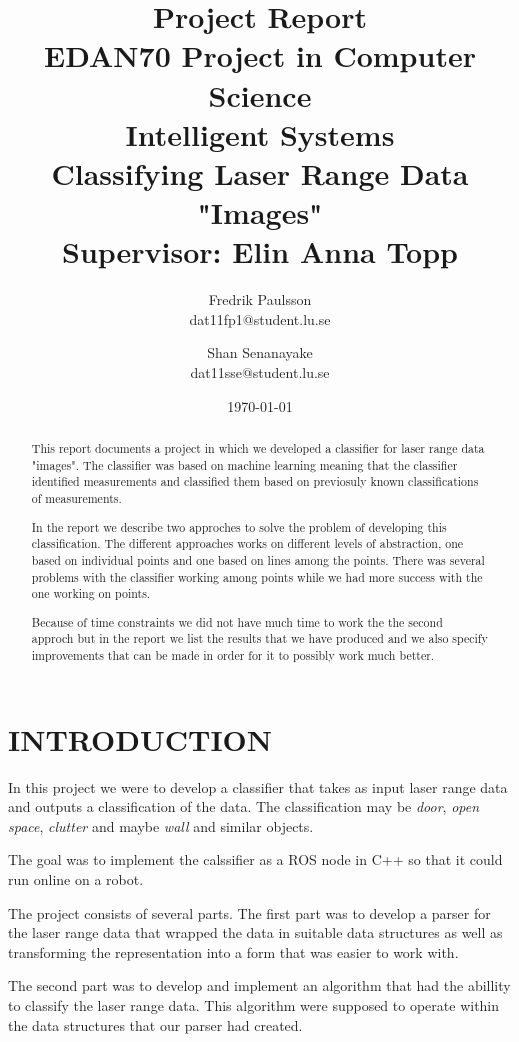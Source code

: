 \documentclass[a4paper, 10pt, conference]{ieeeconf}      %
\title{\LARGE \bf Project Report \\ EDAN70 Project in Computer Science \\ Intelligent Systems \\ Classifying Laser Range Data "Images" \\ Supervisor: Elin Anna Topp}
\date{\today}
\author{Fredrik Paulsson \\ dat11fp1@student.lu.se \and Shan Senanayake \\ dat11sse@student.lu.se}
\begin{document}
\maketitle
\thispagestyle{empty}
\pagestyle{empty}


\begin{abstract}
This report documents a project in which we developed a classifier for laser range data "images". The classifier was based on machine learning meaning that the classifier identified measurements and classified them based on previosuly known classifications of measurements.

In the report we describe two approches to solve the problem of developing this classification. The different approaches works on different levels of abstraction, one based on individual points and one based on lines among the points. There was several problems with the classifier working among points while we had more success with the one working on points.

Because of time constraints we did not have much time to work the the second approch but in the report we list the results that we have produced and we also specify improvements that can be made in order for it to possibly work much better.


\end{abstract}


\section{INTRODUCTION}

In this project we were to develop a classifier that takes as input laser range data and outputs a classification of the data. The classification may be \emph{door}, \emph{open space}, \emph{clutter} and maybe \emph{wall} and similar objects.

The goal was to implement the calssifier as a ROS node in C++ so that it could run online on a robot.

The project consists of several parts. The first part was to develop a parser for the laser range data that wrapped the data in suitable data structures as well as transforming the representation into a form that was easier to work with.

The second part was to develop and implement an algorithm that had the abillity to classify the laser range data. This algorithm were supposed to operate within the data structures that our parser had created.
\end{document}
